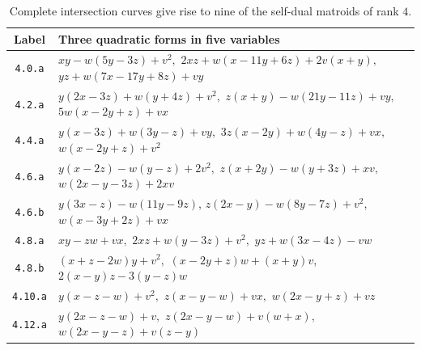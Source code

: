 \documentclass[12pt]{extarticle}
\theoremstyle{definition}
\numberwithin{theorem}{section}
\theoremstyle{plain}\newtheorem{ithm}{Theorem}
\begin{document}
\begin{table}[h]
    \begin{center}
        \begin{tabular}{cl}
            Label & Three quadratic forms in five variables \\
            \hline
            \texttt{4.0.a} &     $  xy -w( 5y {-} 3 z) +v^2 ,$    $ 2xz + w(x  {-} 11y  {+} 6 z) + 2 v (x{+}y)
            ,$ $ yz +  w(7 x {-} 17y  {+} 8  z ) + v y$\\
            \hline
            \texttt{4.2.a} & $y(2x-3z)+w(y+4z) +v^2,$ $z(x+y)-w(21y-11z) +vy,$ $
            5w(x-2y+z)+vx$\\
            \hline
            \texttt{4.4.a}     &    $ y( x   - 3 z )+ w(3 y - z ) + v y,$
            $ 3z(x   - 2 y ) +w(4 y   - z  ) + v x,$
            $ w(x   - 2 y   + z  ) + v^2$\\
            \hline
            \texttt{4.6.a} &    $ y(x  - 2  z)- w ( y-  z  ) + 2v^2,$
            $ z(x   + 2 y  ) -w( y  +3z) + xv ,$ 
            $ w(2 x  - y   -3  z ) + 2xv $\\
            \hline
            \texttt{4.6.b} & $ y(3x-z)-w(11y-9z)$,
                $    z(2x-y)-w(8y-7z)+v^2$,
                $    w(x-3y+2z)+vx$    \\
            \hline
            \texttt{4.8.a} &    $ x y - z  w +vx,$
            $ 2x  z +    w (y- 3  z) + v^2,$
            $ y  z + w( 3  x  - 4  z ) - vw$     \\
            \hline
            \texttt{4.8.b} & $(x+z-2w)y+v^2,$ $(x-2y+z)w+(x+y)v$,  $2(x-y)z-3(y-z)w$\\
            \hline
            \texttt{4.10.a} &    $ y( x  -   z -   w) + v^2,$
            $ z(x   - y   -   w) + v x,$
            $ w(2x  -   y  + z ) + v z$    \\
            \hline
            \texttt{4.12.a} &    $ y (2x  - z -  w )+ v ,$
            $ z(2x   -   y  -   w) + v (w+x),$
            $  w(2 x - y   -   z) + v (z-y)$     \\
            \hline
        \end{tabular}
        \caption{Complete intersection curves give rise to nine of the self-dual matroids of rank $4$.}
        \label{tab:genus5}
    \end{center}
\end{table}
\end{document}

